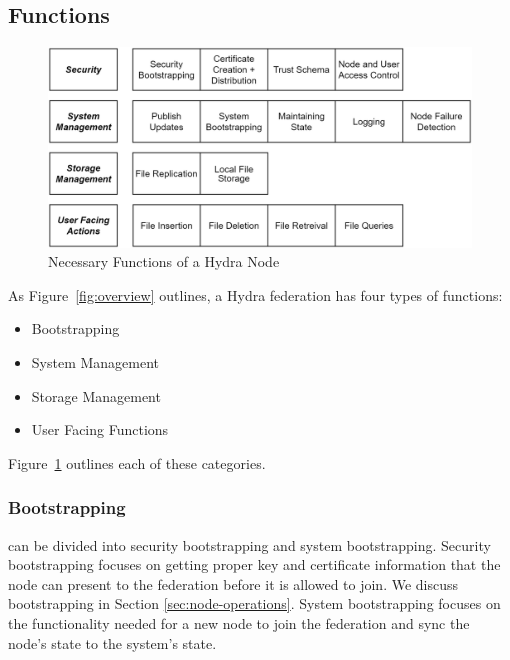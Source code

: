 \subsection{Functions} \label{subsec:functions}

\begin{figure}[!ht]
    \centering
    \includegraphics[width=2\columnwidth]{visuals/node-functions.png}
    \caption{Necessary Functions of a Hydra Node}
    \label{fig:node-functions}
\end{figure}

As Figure~\ref{fig:overview} outlines, a Hydra federation has four types of functions:

\begin{itemize}
    \item Bootstrapping
    \item System Management
    \item Storage Management
    \item User Facing Functions
\end{itemize}

Figure~\ref{fig:node-functions} outlines each of these categories.

\subsubsection{Bootstrapping} can be divided into security bootstrapping and system bootstrapping. Security bootstrapping focuses on getting proper key and certificate information that the node can present to the federation before it is allowed to join. We discuss bootstrapping in Section   \ref{sec:node-operations}. System bootstrapping focuses on the functionality needed for a new node to join the federation and sync the node's state to the system's state. 

